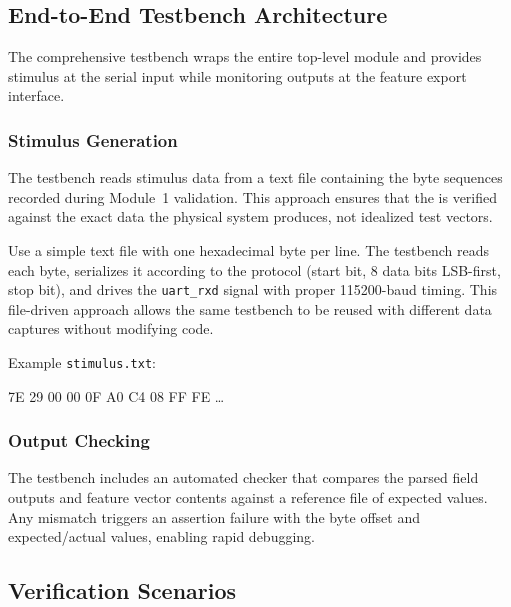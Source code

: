 \documentclass[11pt,letterpaper]{article}
\begin{document}
	\subsection{End-to-End Testbench Architecture}

	The comprehensive testbench wraps the entire \FPGA{} top-level module and provides stimulus at the \UART{} serial input while monitoring outputs at the feature \BRAM{} export interface.

	\subsubsection{Stimulus Generation}

	The testbench reads stimulus data from a text file containing the byte sequences recorded during Module~1 validation. This approach ensures that the \RTL{} is verified against the exact data the physical system produces, not idealized test vectors.

	\begin{tcolorbox}[infobox={Stimulus File Format}]
		Use a simple text file with one hexadecimal byte per line. The testbench reads each byte, serializes it according to the \UART{} protocol (start bit, 8 data bits LSB-first, stop bit), and drives the \texttt{uart\_rxd} signal with proper 115200-baud timing. This file-driven approach allows the same testbench to be reused with different data captures without modifying \VHDL{} code.

		Example \texttt{stimulus.txt}:
		\begin{center}
			\ttfamily 7E 29 00 00 0F A0 C4 08 FF FE \ldots
		\end{center}
	\end{tcolorbox}

	\subsubsection{Output Checking}

	The testbench includes an automated checker that compares the parsed field outputs and feature vector contents against a reference file of expected values. Any mismatch triggers an assertion failure with the byte offset and expected/actual values, enabling rapid debugging.

	\subsection{Verification Scenarios}
\end{document}
